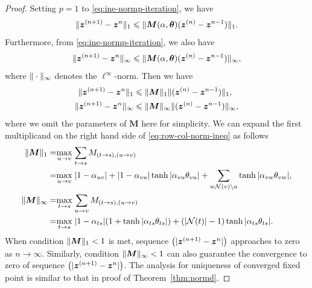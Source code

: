 \begin{proof}
  Setting $p=1$ to \eqref{eq:ine-normp-iteration}, we have
  \begin{equation}
    \| \bm{z}^{(n+1)} - \bm{z}^{n} \|_{1} \leqslant \| \bm{M}(\alpha, \bm{\theta})(\bm{z}^{(n)} - \bm{z}^{n-1}) \|_{1}.
  \end{equation}
  Furthermore, from \eqref{eq:ine-normp-iteration}, we also have
  \begin{equation}
    \| \bm{z}^{(n+1)} - \bm{z}^{n} \|_{\infty} \leqslant \| \bm{M}(\alpha, \bm{\theta})(\bm{z}^{(n)} - \bm{z}^{n-1}) \|_{\infty},
  \end{equation}
  where $\| \cdot \|_{\infty}$ denotes the $\ell^{\infty}$-norm.
  Then we have
  \begin{align}\label{eq:row-col-norm-ineq}
    \| \bm{z}^{(n+1)} - \bm{z}^{n} \|_{1} &\leqslant \| \bm{M} \|_{1}\| (\bm{z}^{(n)} - \bm{z}^{n-1}) \|_{1}, \nonumber \\
    \| \bm{z}^{(n+1)} - \bm{z}^{n} \|_{\infty} &\leqslant \| \bm{M} \|_{\infty}\| (\bm{z}^{(n)} - \bm{z}^{n-1}) \|_{\infty},
  \end{align}
  where we omit the parameters of $\bm{M}$ here for simplicity. We can expand the first multiplicand on the right hand side of \eqref{eq:row-col-norm-ineq} as follows
  \begin{align}
    \| \bm{M} \|_{1} =& \underset{u \rightarrow v}{\max}\;{\sum_{t\rightarrow s} M_{(t\rightarrow s), (u\rightarrow v)}} \nonumber \\
    =& \underset{u \rightarrow v}{\max}\;| 1-\alpha_{uv} | + | 1-\alpha_{vu} |\tanh{| \alpha_{vu} \theta_{vu} |} + \sum_{w \mathcal{N}(v) \backslash u} \tanh{| \alpha_{{vw}} \theta_{vw} |}, \nonumber \\
    \| \bm{M} \|_{\infty} =& \underset{t \rightarrow s}{\max}\;{\sum_{u\rightarrow v} M_{(t\rightarrow s), (u\rightarrow v)}} \nonumber \\
    =& \underset{t \rightarrow s}{\max}\; | 1-\alpha_{ts} | (1 + \tanh| \alpha_{ts} \theta_{ts} |) + (| \mathcal{N}(t) |-1)\tanh| \alpha_{ts} \theta_{ts} |.
  \end{align}
  When condition $\| \bm{M} \|_{1} < 1$ is met, sequence $\left( | \bm{z}^{(n+1)} - \bm{z}^{n} | \right)$ approaches to zero as $n\rightarrow \infty$. Similarly, condition $\| \bm{M} \|_{\infty}<1$ can also guarantee the convergence to zero of sequence $\left( | \bm{z}^{(n+1)} - \bm{z}^{n} | \right)$. The analysis for uniqueness of converged fixed point is similar to that in proof of Theorem~\ref{thm:normd}.
\end{proof}

